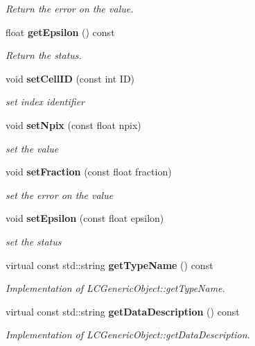 \begin{DoxyCompactItemize}
\begin{DoxyCompactList}\small\item\em Return the error on the value. \end{DoxyCompactList}\item 
float {\bf get\-Epsilon} () const \label{classCALICE_1_1SaturationParameters_a8ae9b72141c04d4737efecaed397561f}

\begin{DoxyCompactList}\small\item\em Return the status. \end{DoxyCompactList}\item 
void {\bf set\-Cell\-I\-D} (const int I\-D)\label{classCALICE_1_1SaturationParameters_a18580ee23f36d2ab14f070aab1eb3b87}

\begin{DoxyCompactList}\small\item\em set index identifier \end{DoxyCompactList}\item 
void {\bf set\-Npix} (const float npix)\label{classCALICE_1_1SaturationParameters_a2a05f0a0d82bc61e6143b02d4f7413ea}

\begin{DoxyCompactList}\small\item\em set the value \end{DoxyCompactList}\item 
void {\bf set\-Fraction} (const float fraction)\label{classCALICE_1_1SaturationParameters_a7959da20d57e2d14422b6543854706c0}

\begin{DoxyCompactList}\small\item\em set the error on the value \end{DoxyCompactList}\item 
void {\bf set\-Epsilon} (const float epsilon)\label{classCALICE_1_1SaturationParameters_a30a1dfd7727fbc4d06daed2ac90cbf80}

\begin{DoxyCompactList}\small\item\em set the status \end{DoxyCompactList}\item 
virtual const std\-::string {\bf get\-Type\-Name} () const \label{classCALICE_1_1SaturationParameters_a002bce0457608d0922e5c9c8d681e780}

\begin{DoxyCompactList}\small\item\em Implementation of L\-C\-Generic\-Object\-::get\-Type\-Name. \end{DoxyCompactList}\item 
virtual const std\-::string {\bf get\-Data\-Description} () const \label{classCALICE_1_1SaturationParameters_a093e3b01f25cbb982a7ee779198e1280}

\begin{DoxyCompactList}\small\item\em Implementation of L\-C\-Generic\-Object\-::get\-Data\-Description. \end{DoxyCompactList}\end{DoxyCompactItemize}


